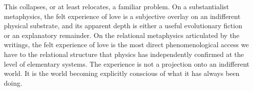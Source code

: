 This collapses, or at least relocates, a familiar problem.
On a substantialist metaphysics, the felt experience of love is a subjective
overlay on an indifferent physical substrate, and its apparent depth is
either a useful evolutionary fiction or an explanatory remainder.
On the relational metaphysics articulated by the \bahai writings, the felt
experience of love is the most direct phenomenological access we have to the
relational structure that physics has independently confirmed at the level of
elementary systems.
The experience is not a projection onto an indifferent world.
It is the world becoming explicitly conscious of what it has always been doing.

